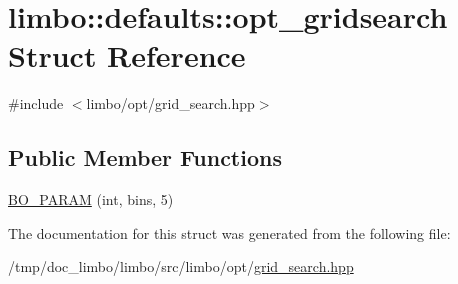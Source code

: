 \hypertarget{structlimbo_1_1defaults_1_1opt__gridsearch}{}\section{limbo\+:\+:defaults\+:\+:opt\+\_\+gridsearch Struct Reference}
\label{structlimbo_1_1defaults_1_1opt__gridsearch}


{\ttfamily \#include $<$limbo/opt/grid\+\_\+search.\+hpp$>$}

\subsection*{Public Member Functions}
\begin{DoxyCompactItemize}
\item 
\hyperlink{group__opt__defaults_ga0ce56e9b25771d8a1b381b6ec132b8fe}{B\+O\+\_\+\+P\+A\+R\+A\+M} (int, bins, 5)
\end{DoxyCompactItemize}


The documentation for this struct was generated from the following file\+:\begin{DoxyCompactItemize}
\item 
/tmp/doc\+\_\+limbo/limbo/src/limbo/opt/\hyperlink{grid__search_8hpp}{grid\+\_\+search.\+hpp}\end{DoxyCompactItemize}
